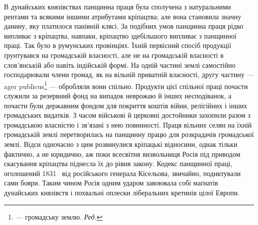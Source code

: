 В дунайських князівствах панщинна праця була сполучена
з натуральними рентами та всякими іншими атрибутами кріпацтва;
але вона становила значну данину, яку платилося панівній
клясі. За подібних умов панщинна праця рідко випливає з
кріпацтва, навпаки, кріпацтво здебільшого випливає з панщинної
праці. Так було в румунських провінціях. Їхній первісний
спосіб продукції ґрунтувався на громадській власності, але
не на громадській власності в слов’янській або навіть індійській
формі. На одній частині землі самостійно господарювали члени
громад, як на вільній приватній власності, другу частину — ager
publicus\footnote*{
— громадську землю. \emph{Ред.}
} — обробляли вони спільно. Продукти цієї спільної праці
почасти служили за резервний фонд на випадок неврожаю й інших
несподіванок, а почасти були державним фондом для покриття
коштів війни, релігійних і інших громадських видатків. З часом
військові й церковні достойники захопили разом з громадською
власністю і зв’язані з нею повинності. Праця вільних селян на
їхній громадській землі перетворилась на панщинну працю для
розкрадачів громадської землі. Відси одночасно з цим розвинулися
кріпацькі відносини, однак тільки фактично, а не юридично,
аж поки всесвітня визвольниця Росія під приводом скасування
кріпацтва піднесла їх до рівня закону. Кодекс панщинної праці,
оголошений 1831~ від російського генерала Кісельова, звичайно,
подиктували сами бояри. Таким чином Росія одним ударом завоювала
собі маґнатів дунайських князівств і похвальні оплески
ліберальних кретинів цілої Европи.

